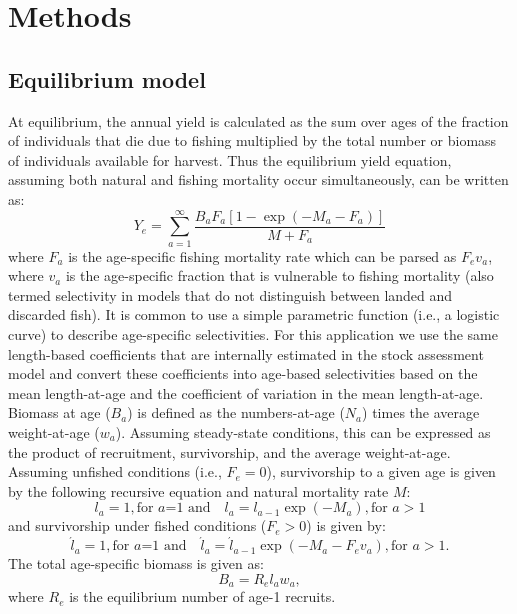 \section*{Methods} %
\label{sec:methods}

\subsection*{Equilibrium model} %
\label{sub:equilibrium_model}
At equilibrium, the annual yield is calculated as the sum over ages of the fraction of individuals that die due to fishing multiplied by the total number or biomass of individuals available for harvest.  Thus the equilibrium yield equation, assuming both natural and fishing mortality occur simultaneously,  can be written as:
\begin{equation}\label{eq:Y_e}
	Y_e = \sum_{a=1}^\infty \frac{B_a F_a [1-\exp(-M_a-F_a)]}{M+F_a}
\end{equation}
where $F_a$ is the age-specific fishing mortality rate which can be parsed as $F_e v_a$, where $v_a$ is the age-specific fraction that is vulnerable to fishing mortality (also termed selectivity in models that do not distinguish between landed and discarded fish).  It is common to use a simple parametric function (i.e., a logistic curve) to describe age-specific selectivities.  For this application we use the same length-based coefficients that are internally estimated in the stock assessment model and convert these coefficients into age-based selectivities based on the mean length-at-age and the coefficient of variation in the mean length-at-age.  Biomass at age ($B_a$) is defined as the numbers-at-age ($N_a$) times the average weight-at-age ($w_a$).  Assuming steady-state conditions, this can be expressed as the product of recruitment, survivorship, and the average weight-at-age.  Assuming unfished conditions (i.e., $F_e=0$), survivorship to a given age is given by the following recursive equation and natural mortality rate $M$:
\begin{equation}\label{eq:unfished_survivorship}
	l_a = 1,  \mbox{for $a$=1 and} \quad l_a= l_{a-1} \exp(-M_a),  \mbox{for $a>1$}
\end{equation}
and survivorship under fished conditions ($F_e > 0$) is given by:
\begin{equation}\label{eq:fished_survivorship}
	\acute{l}_a =1, \mbox{for $a$=1 and} \quad \acute{l}_{a} = \acute{l}_{a-1} \exp(-M_a-F_e v_a), \mbox{for $a>1$}. 
\end{equation}
The total age-specific biomass  is given as:
\begin{equation} \label{eq:B_a}
	B_a = R_e l_a w_a,
\end{equation}
where $R_e$ is the equilibrium number of age-1 recruits.

